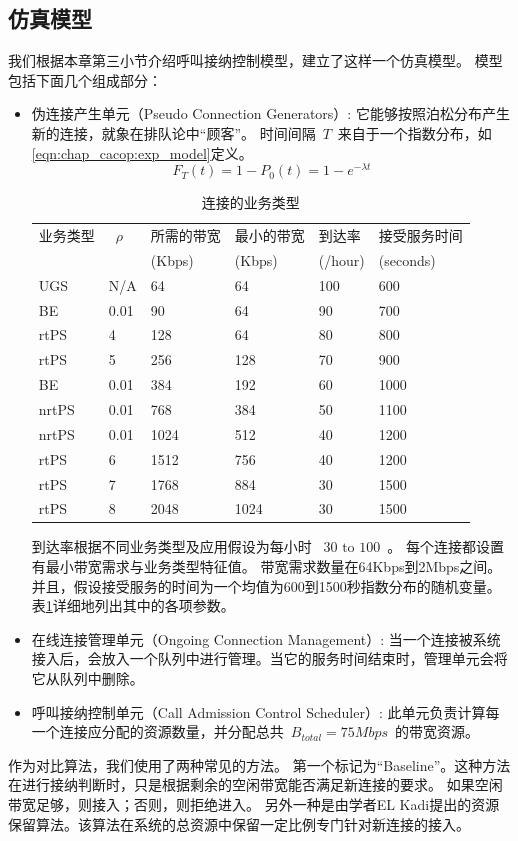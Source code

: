 \subsection{仿真模型}
我们根据本章第三小节介绍呼叫接纳控制模型，建立了这样一个仿真模型。
模型包括下面几个组成部分：
\begin{itemize}
\item 伪连接产生单元（Pseudo Connection Generators）: 它能够按照泊松分布产生新的连接，就象在排队论中“顾客”。
    时间间隔~$T$~来自于一个指数分布，如\eqref{eqn:chap_cacop:exp_model}定义。
%
\begin{equation}
\label{eqn:chap_cacop:exp_model}
F_T(t) = 1 - P_0(t) = 1 - e^{-\lambda t}
\end{equation}
%
\begin{table}[tb]
\caption{连接的业务类型} \label{tb:chap_cacop:sim_cfg}
\begin{center}
\wuhao
\begin{tabularx}{0.99\linewidth}{XXXXXX}
\toprule
业务类型 &~$\rho$~ &所需的带宽 & 最小的带宽 &到达率 &接受服务时间 \\
&&(Kbps)& (Kbps) & (/hour) &(seconds) \\
\midrule
UGS& N/A &64 &64 & 100 &600\\
BE & 0.01&90 &64 &90 &700\\
rtPS &4& 128 &64 &80 &800\\
rtPS &5& 256 &128 &70 &900\\
BE &0.01& 384 &192 &60 &1000\\
nrtPS &0.01& 768 &384 &50 &1100\\
nrtPS &0.01& 1024 &512 &40 &1200\\
rtPS &6& 1512 &756 &40 &1200\\
rtPS &7& 1768 &884 &30 &1500\\
rtPS &8& 2048 &1024 &30 &1500\\
\bottomrule
\end{tabularx}
\end{center}
\end{table}
到达率根据不同业务类型及应用假设为每小时 ~$30 \text{ to } 100 $~。
每个连接都设置有最小带宽需求与业务类型特征值。
带宽需求数量在64Kbps到2Mbps之间。
并且，假设接受服务的时间为一个均值为600到1500秒指数分布的随机变量。
表\ref{tb:chap_cacop:sim_cfg}详细地列出其中的各项参数。

\item 在线连接管理单元（Ongoing Connection Management）: 当一个连接被系统接入后，会放入一个队列中进行管理。当它的服务时间结束时，管理单元会将它从队列中删除。

\item 呼叫接纳控制单元（Call Admission Control Scheduler）: 此单元负责计算每一个连接应分配的资源数量，并分配总共~$B_{total}=75Mbps$~的带宽资源。 
\end{itemize}
作为对比算法，我们使用了两种常见的方法。
第一个标记为“Baseline”。这种方法在进行接纳判断时，只是根据剩余的空闲带宽能否满足新连接的要求。
如果空闲带宽足够，则接入；否则，则拒绝进入。
另外一种是由学者EL Kadi提出的资源保留算法。该算法在系统的总资源中保留一定比例专门针对新连接的接入\cite{EL-Kadi2002}。
